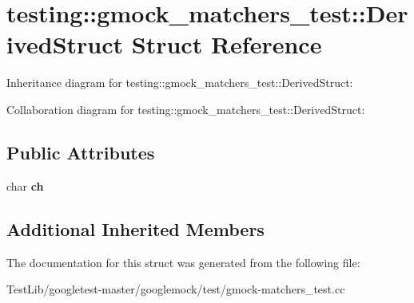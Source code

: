 \hypertarget{structtesting_1_1gmock__matchers__test_1_1DerivedStruct}{}\section{testing\+:\+:gmock\+\_\+matchers\+\_\+test\+:\+:Derived\+Struct Struct Reference}
\label{structtesting_1_1gmock__matchers__test_1_1DerivedStruct}


Inheritance diagram for testing\+:\+:gmock\+\_\+matchers\+\_\+test\+:\+:Derived\+Struct\+:


Collaboration diagram for testing\+:\+:gmock\+\_\+matchers\+\_\+test\+:\+:Derived\+Struct\+:
\subsection*{Public Attributes}
\begin{DoxyCompactItemize}
\item 
\mbox{\label{structtesting_1_1gmock__matchers__test_1_1DerivedStruct_abd7de960817b2c889f109ae6f2869f4c}} 
char {\bfseries ch}
\end{DoxyCompactItemize}
\subsection*{Additional Inherited Members}


The documentation for this struct was generated from the following file\+:\begin{DoxyCompactItemize}
\item 
Test\+Lib/googletest-\/master/googlemock/test/gmock-\/matchers\+\_\+test.\+cc\end{DoxyCompactItemize}
